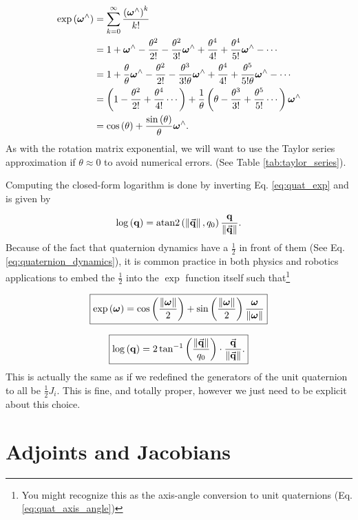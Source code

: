 \begin{align}
\exp\left(\omegabf^{\wedge}\right) & =\sum_{k=0}^{\infty}\frac{\left(\omegabf^{\wedge}\right)^{k}}{k!}\nonumber \\
 & =1+\omegabf^{\wedge}-\frac{\theta^{2}}{2!}-\frac{\theta^{2}}{3!}\omegabf^{\wedge}+\frac{\theta^{4}}{4!}+\frac{\theta^{4}}{5!}\omegabf^{\wedge}-\cdots\nonumber \\
 & =1+\frac{\theta}{\theta}\omegabf^{\wedge}-\frac{\theta^{2}}{2!}-\frac{\theta^{3}}{3!\theta}\omegabf^{\wedge}+\frac{\theta^{4}}{4!}+\frac{\theta^{5}}{5!\theta}\omegabf^{\wedge}-\cdots\nonumber \\
 & =\left(1-\frac{\theta^{2}}{2!}+\frac{\theta^{4}}{4!}\cdots\right)+\frac{1}{\theta}\left(\theta-\frac{\theta^{3}}{3!}+\frac{\theta^{5}}{5!}\cdots\right)\omegabf^{\wedge}\nonumber \\
 & =\cos\left(\theta\right)+\frac{\sin\left(\theta\right)}{\theta}\omegabf^{\wedge}.\label{eq:quat_exp}
\end{align}
As with the rotation matrix exponential, we will want to use the Taylor
series approximation if $\theta\approx0$ to avoid numerical errors.
(See Table \ref{tab:taylor_series}).

Computing the closed-form logarithm is done by inverting Eq. \ref{eq:quat_exp}
and is given by

\[
\log\left(\mathbf{q}\right)=\textnormal{atan2}\left(\left\|\vec{\mathbf{q}}\right\|,q_{0}\right)\frac{\mathbf{q}}{\left\|\vec{\mathbf{q}}\right\|}.
\]
Because of the fact that quaternion dynamics have a $\frac{1}{2}$
in front of them (See Eq. \ref{eq:quaternion_dynamics}), it is common
practice in both physics and robotics applications to embed the $\frac{1}{2}$
into the $\exp$ function itself such that\footnote{You might recognize this as the axis-angle conversion to unit quaternions
(Eq. \ref{eq:quat_axis_angle})}

\[
\boxed{\exp\left(\boldsymbol{\omega}\right)=\cos\left(\frac{\left\|\boldsymbol{\omega}\right\|}{2}\right)+\sin\left(\frac{\left\|\boldsymbol{\omega}\right\|}{2}\right)\frac{\boldsymbol{\omega}}{\left\|\boldsymbol{\omega}\right\|}}
\]

\[
\boxed{\log\left(\mathbf{q}\right)=2\tan^{-1}\left(\frac{\left\|\vec{\mathbf{q}}\right\|}{q_{0}}\right)\cdot\frac{\vec{\mathbf{q}}}{\left\|\vec{\mathbf{q}}\right\|}.}
\]
This is actually the same as if we redefined the generators of the
unit quaternion to all be $\frac{1}{2}J_{i}$. This is fine, and totally
proper, however we just need to be explicit about this choice.


\section{Adjoints and Jacobians}
\label{sec:ad_as_jacobian}

